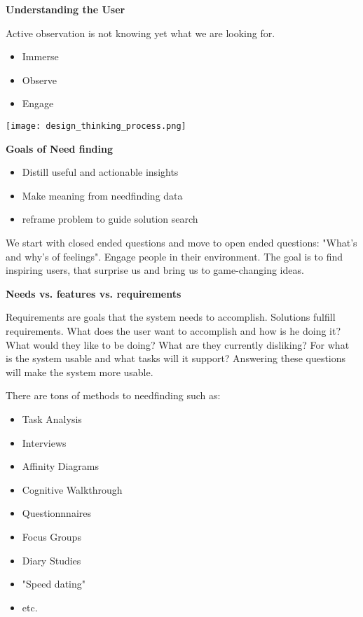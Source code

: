 \textbf{Understanding the User} \smallskip

Active observation is not knowing yet what we are looking for. 

\begin{multicols}{2}
    \begin{itemize}[itemsep=-5pt, topsep=0pt, leftmargin=*]
	\item Immerse
	\item Observe
	\item Engage

	\end{itemize}
\end{multicols}


\begin{center}
	\texttt{[image: design\_thinking\_process.png]}
\end{center}


\textbf{Goals of Need finding}


\begin{itemize}[itemsep=-5pt, topsep=3pt, leftmargin=*]
	\item Distill useful and actionable insights
	\item Make meaning from needfinding data
	\item reframe problem to guide solution search
\end{itemize}

\medskip

We start with closed ended questions and move to open ended questions: "What's and why's of feelings". Engage people in their environment.
The goal is to find inspiring users, that surprise us and bring us to game-changing ideas. \medskip

\textbf{Needs vs. features vs. requirements}

Requirements are goals that the system needs to accomplish. Solutions fulfill requirements. What does the user want to accomplish and how is he doing it?
What would they like to be doing? What are they currently disliking? For what is the system usable and what tasks will it support? Answering these questions will make the system more usable. \medskip

There are tons of methods to needfinding such as: 

\begin{multicols}{2}
    \begin{itemize}[itemsep=-5pt, topsep=-20pt, leftmargin=*]
	\item Task Analysis
	\item Interviews
	\item Affinity Diagrams
	\item Cognitive Walkthrough
	\item Questionnnaires
	\item Focus Groups
	\item Diary Studies
	\item "Speed dating"
	\item etc.
	\end{itemize}
\end{multicols}

